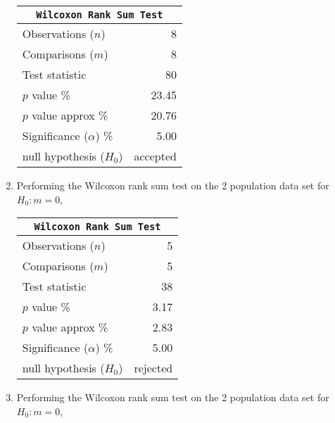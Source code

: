 \begin{enumerate}
	\begin{table}[H]
		\centering
		\begin{tabular}{@{}lr@{}}
			\toprule
			\multicolumn{2}{c}{\texttt{Wilcoxon Rank Sum Test}} \\
			\midrule
			Observations ($n$)         &         8 \\
			Comparisons ($m$)          &         8 \\
			Test statistic             &        80 \\
			$p$ value \%               &     23.45 \\
			$p$ value approx \%        &     20.76 \\
			Significance ($\alpha$) \% &      5.00 \\
			null hypothesis ($H_0$)    &  accepted \\
			\bottomrule
		\end{tabular}
		
	\end{table}
	\bigskip
	
	\item Performing the Wilcoxon rank sum test on the 2 population data set for $ H_0 : m = 0 $,
	
	\begin{table}[H]
		\centering
		\begin{tabular}{@{}lr@{}}
			\toprule
			\multicolumn{2}{c}{\texttt{Wilcoxon Rank Sum Test}} \\
			\midrule
			Observations ($n$)         &         5 \\
			Comparisons ($m$)          &         5 \\
			Test statistic             &        38 \\
			$p$ value \%               &      3.17 \\
			$p$ value approx \%        &      2.83 \\
			Significance ($\alpha$) \% &      5.00 \\
			null hypothesis ($H_0$)    &  rejected \\
			\bottomrule
		\end{tabular}
		
	\end{table}
	\bigskip
	
	\item Performing the Wilcoxon rank sum test on the 2 population data set for $ H_0 : m = 0 $,
	

\end{enumerate}
